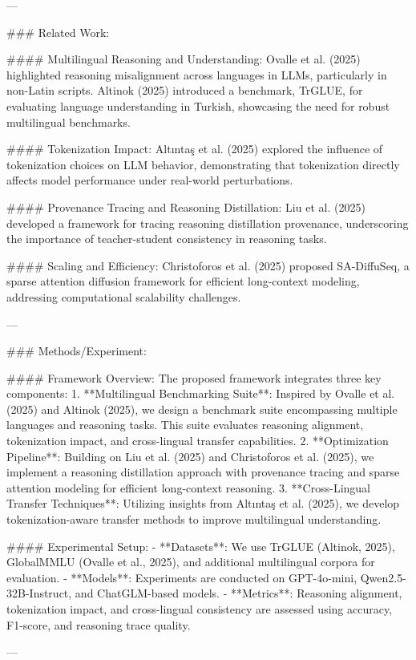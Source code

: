 ---

### Related Work:

#### Multilingual Reasoning and Understanding:
Ovalle et al. (2025) highlighted reasoning misalignment across languages in LLMs, particularly in non-Latin scripts. Altinok (2025) introduced a benchmark, TrGLUE, for evaluating language understanding in Turkish, showcasing the need for robust multilingual benchmarks.

#### Tokenization Impact:
Altıntaş et al. (2025) explored the influence of tokenization choices on LLM behavior, demonstrating that tokenization directly affects model performance under real-world perturbations.

#### Provenance Tracing and Reasoning Distillation:
Liu et al. (2025) developed a framework for tracing reasoning distillation provenance, underscoring the importance of teacher-student consistency in reasoning tasks.

#### Scaling and Efficiency:
Christoforos et al. (2025) proposed SA-DiffuSeq, a sparse attention diffusion framework for efficient long-context modeling, addressing computational scalability challenges.

---

### Methods/Experiment:

#### Framework Overview:
The proposed framework integrates three key components:
1. **Multilingual Benchmarking Suite**: Inspired by Ovalle et al. (2025) and Altinok (2025), we design a benchmark suite encompassing multiple languages and reasoning tasks. This suite evaluates reasoning alignment, tokenization impact, and cross-lingual transfer capabilities.
2. **Optimization Pipeline**: Building on Liu et al. (2025) and Christoforos et al. (2025), we implement a reasoning distillation approach with provenance tracing and sparse attention modeling for efficient long-context reasoning.
3. **Cross-Lingual Transfer Techniques**: Utilizing insights from Altıntaş et al. (2025), we develop tokenization-aware transfer methods to improve multilingual understanding.

#### Experimental Setup:
- **Datasets**: We use TrGLUE (Altinok, 2025), GlobalMMLU (Ovalle et al., 2025), and additional multilingual corpora for evaluation.
- **Models**: Experiments are conducted on GPT-4o-mini, Qwen2.5-32B-Instruct, and ChatGLM-based models.
- **Metrics**: Reasoning alignment, tokenization impact, and cross-lingual consistency are assessed using accuracy, F1-score, and reasoning trace quality.

---

